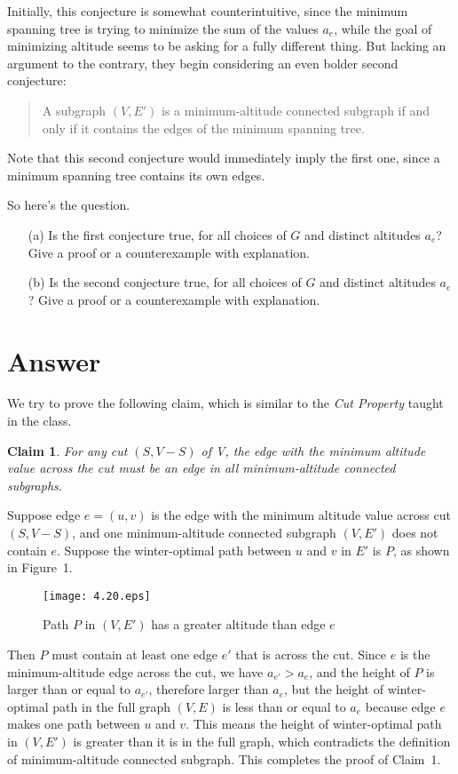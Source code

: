 \documentclass[12pt,letterpaper]{article}
\newtheorem{clm}{Claim}
\begin{document}
Initially, this conjecture is somewhat counterintuitive, since the minimum
spanning tree is trying to minimize the sum of the values $a_e$, while
the goal of minimizing altitude seems to be asking for a fully different
thing. But lacking an argument to the contrary, they begin considering an
even bolder second conjecture:
\begin{quote}
A subgraph $(V, E')$ is a minimum-altitude connected subgraph if and only if
it contains the edges of the minimum spanning tree.
\end{quote}
Note that this second conjecture would immediately imply the first one,
since a minimum spanning tree contains its own edges.

So here's the question.
\begin{itemize}
\item[(a)] Is the first conjecture true, for all choices of $G$ and distinct altitudes
$a_e$? Give a proof or a counterexample with explanation.
\item[(b)] Is the second conjecture true, for all choices of $G$ and distinct altitudes
$a_e$? Give a proof or a counterexample with explanation.
\end{itemize}

\section*{Answer}
We try to prove the following claim, which is similar to the \emph{Cut Property} taught in the class.
\begin{clm}
For any cut $(S, V-S)$ of V, the edge with the minimum altitude value across the cut must be an edge in all minimum-altitude connected subgraphs.
\end{clm}
Suppose edge $e=(u,v)$ is the edge with the minimum altitude value across cut $(S, V-S)$, and one minimum-altitude connected subgraph $(V,E')$ does not contain $e$. Suppose the winter-optimal path between $u$ and $v$ in $E'$ is $P$, as shown in Figure~1.

\begin{figure}
\begin{center}
\texttt{[image: 4.20.eps]}
\caption{Path $P$ in $(V, E')$ has a greater altitude than edge $e$}
\end{center}
\vspace{-2ex}
\end{figure}

Then $P$ must contain at least one edge $e'$ that is across the cut. Since $e$ is the minimum-altitude edge across the cut, we have $a_{e'}>a_e$, and the height of $P$ is larger than or equal to $a_{e'}$, therefore larger than $a_e$, but the height of winter-optimal path in the full graph $(V,E)$ is less than or equal to $a_e$ because edge $e$ makes one path between $u$ and $v$. This means the height of winter-optimal path in $(V,E')$ is greater than it is in the full graph, which contradicts the definition of minimum-altitude connected subgraph. This completes the proof of Claim~1.
\end{document}
